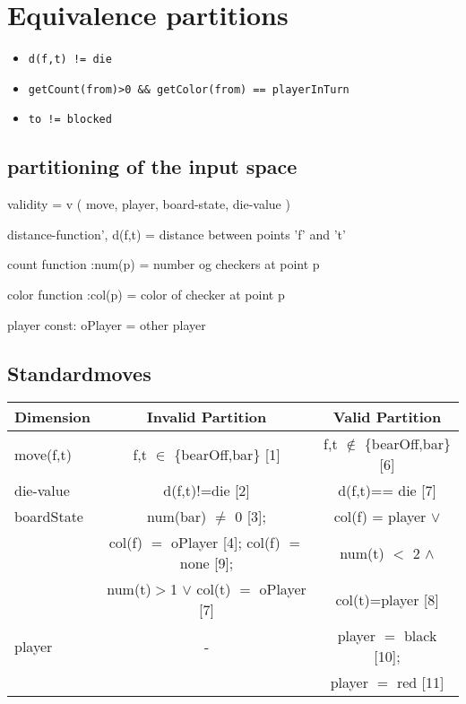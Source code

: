 \documentclass[a4paper]{article}
\begin{document}
\lhead{}
\rhead{}

\section{Equivalence partitions}

\begin{itemize}
\item
\begin{verbatim}
d(f,t) != die
\end{verbatim}


\item
\begin{verbatim}
getCount(from)>0 && getColor(from) == playerInTurn
\end{verbatim}


\item
\begin{verbatim}
to != blocked
\end{verbatim}

\end{itemize}

\subsection{partitioning of the input space}
validity = v ( move, player, board-state, die-value ) 

distance-function', d(f,t) = distance between points 'f' and 't'

count function :num(p) = number og checkers at point p

color function :col(p) = color of checker at point p

player const: oPlayer = other player 

\subsection{Standardmoves}

\noindent
\begin{tabular}{l|c|c}
Dimension & Invalid Partition & Valid Partition \\
\toprule
move(f,t) & f,t $\in$ \{bearOff,bar\} [1] & f,t $\notin$ \{bearOff,bar\} [6] \\
\midrule
die-value & d(f,t)!=die [2] & d(f,t)== die [7] \\
\midrule
boardState & num(bar) $\neq$ 0 [3];    & col(f) = player $\vee$ \\
           & col(f) $=$ oPlayer [4]; col(f) $=$ none [9];
              & num(t) $<$ 2 $\wedge$ \\
           & num(t)$>$1 $\vee$ col(t) $=$ oPlayer [7] & col(t)=player
           [8] \\
\midrule
player & - & player $=$ black [10]; \\
       &   & player $=$ red [11] \\
\bottomrule
\end{tabular}
\end{document}
